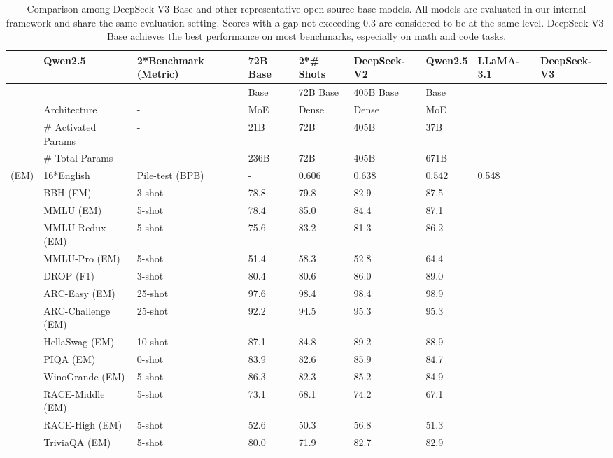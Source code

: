 \documentclass[11pt,a4paper]{article}
\begin{document}
\begin{table}[h]
\caption{Comparison among DeepSeek-V3-Base and other representative open-source base models. All models are evaluated in our internal framework and share the same evaluation setting. Scores with a gap not exceeding 0.3 are considered to be at the same level. DeepSeek-V3-Base achieves the best performance on most benchmarks, especially on math and code tasks.}
\begin{tabular}{|l|l|l|l|l|l|l|l|l|}
\hline
 & Qwen2.5 & 2*Benchmark (Metric) & 72B Base & 2*\# Shots & DeepSeek-V2 & Qwen2.5 & LLaMA-3.1 & DeepSeek-V3 \\ \hline
 &  &  & Base & 72B Base & 405B Base & Base &  &  \\ \hline
 & Architecture & - & MoE & Dense & Dense & MoE &  &  \\ \hline
 & \# Activated Params & - & 21B & 72B & 405B & 37B &  &  \\ \hline
 & \# Total Params & - & 236B & 72B & 405B & 671B &  &  \\ \hline
(EM) & 16*English & Pile-test (BPB) & - & 0.606 & 0.638 & 0.542 & 0.548 &  \\ \hline
 & BBH (EM) & 3-shot & 78.8 & 79.8 & 82.9 & 87.5 &  &  \\ \hline
 & MMLU (EM) & 5-shot & 78.4 & 85.0 & 84.4 & 87.1 &  &  \\ \hline
 & MMLU-Redux (EM) & 5-shot & 75.6 & 83.2 & 81.3 & 86.2 &  &  \\ \hline
 & MMLU-Pro (EM) & 5-shot & 51.4 & 58.3 & 52.8 & 64.4 &  &  \\ \hline
 & DROP (F1) & 3-shot & 80.4 & 80.6 & 86.0 & 89.0 &  &  \\ \hline
 & ARC-Easy (EM) & 25-shot & 97.6 & 98.4 & 98.4 & 98.9 &  &  \\ \hline
 & ARC-Challenge (EM) & 25-shot & 92.2 & 94.5 & 95.3 & 95.3 &  &  \\ \hline
 & HellaSwag (EM) & 10-shot & 87.1 & 84.8 & 89.2 & 88.9 &  &  \\ \hline
 & PIQA (EM) & 0-shot & 83.9 & 82.6 & 85.9 & 84.7 &  &  \\ \hline
 & WinoGrande (EM) & 5-shot & 86.3 & 82.3 & 85.2 & 84.9 &  &  \\ \hline
 & RACE-Middle (EM) & 5-shot & 73.1 & 68.1 & 74.2 & 67.1 &  &  \\ \hline
 & RACE-High (EM) & 5-shot & 52.6 & 50.3 & 56.8 & 51.3 &  &  \\ \hline
 & TriviaQA (EM) & 5-shot & 80.0 & 71.9 & 82.7 & 82.9 &  &  \\ \hline

\end{tabular}
\end{table}
\end{document}

